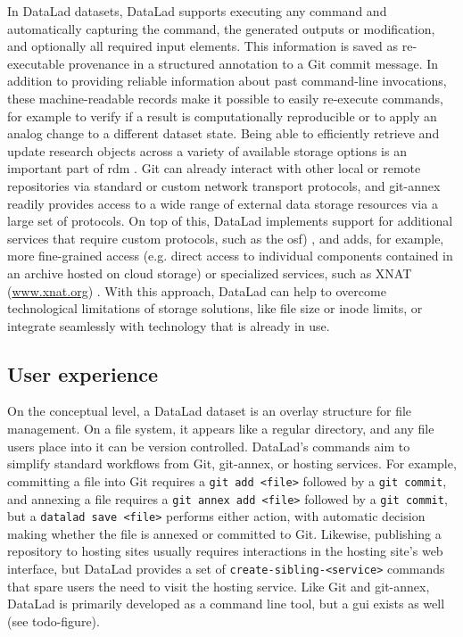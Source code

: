 {In DataLad datasets, DataLad supports executing any command and automatically capturing the command, the generated outputs or modification, and optionally all required input elements.
This information is saved as re-executable provenance in a structured annotation to a Git commit message.
In addition to providing reliable information about past command-line invocations, these machine-readable records make it possible to easily re-execute commands, for example to verify if a result is computationally reproducible or to apply an analog change to a different dataset state.
Being able to efficiently retrieve and update research objects across a variety of available storage options is an important part of \gls{rdm} \citep{borghi2018data}.
Git can already interact with other local or remote repositories via standard or custom network transport protocols, and git-annex readily provides access to a wide range of external data storage resources via a large set of protocols.
On top of this, DataLad implements support for additional services that require custom protocols, such as the \gls{osf}) \citep{hanke2021dlosf}, and adds, for example, more fine-grained access (e.g. direct access to individual components contained in an archive hosted on cloud storage) or specialized services, such as XNAT (\url{www.xnat.org}) \citep{halchenko2021xnat}.
With this approach, DataLad can help to overcome technological limitations of storage solutions, like file size or inode limits, or integrate seamlessly with technology that is already in use.



\subsection{User experience}

On the conceptual level, a DataLad dataset is an overlay structure for file management.
On a file system, it appears like a regular directory, and any file users place into it can be version controlled.
DataLad's commands aim to simplify standard workflows from Git, git-annex, or hosting services.
For example, committing a file into Git requires a \texttt{git add <file>} followed by a \texttt{git commit}, and annexing a file requires a \texttt{git annex add <file>} followed by a \texttt{git commit}, but a \texttt{datalad save <file>} performs either action, with automatic decision making whether the file is annexed or committed to Git.
Likewise, publishing a repository to hosting sites usually requires interactions in the hosting site's web interface, but DataLad provides a set of \texttt{create-sibling-<service>} commands that spare users the need to visit the hosting service.
Like Git and git-annex, DataLad is primarily developed as a command line tool, but a \gls{gui} exists as well (see todo-figure).


}
